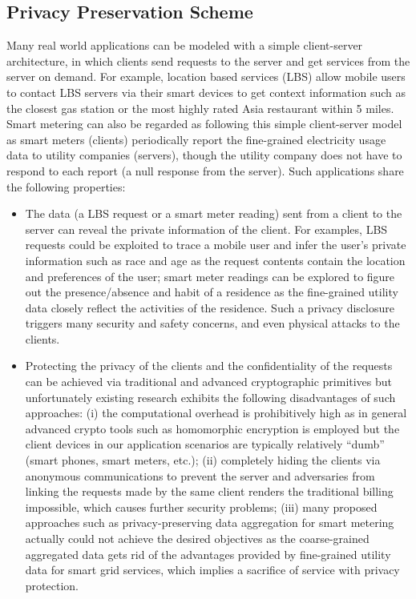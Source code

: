 \documentclass[letterpaper,12pt]{article}
\begin{document}
\subsection {Privacy Preservation Scheme}

Many real world applications can be modeled with a simple client-server architecture, in which clients send requests to the server and get services from the server on demand. For example, location based services (LBS) allow mobile users to contact LBS servers via their smart devices to get context information such as the closest gas station or the most highly rated Asia restaurant within 5 miles. Smart metering can also be regarded as following this simple client-server model as smart meters (clients) periodically report the fine-grained electricity usage data to utility companies (servers), though the utility company does not have to respond to each report (a null response from the server). Such applications share the following properties:
\begin{itemize}
\item The data (a LBS request or a smart meter reading) sent from a client to the server can reveal the private information of the client. For examples, LBS requests could be exploited to trace a mobile user and infer the user's private information such as race and age as the request contents contain the location and preferences of the user; smart meter readings can be explored to figure out the presence/absence and habit of a residence as the fine-grained utility data closely reflect the activities of the residence. Such a privacy disclosure triggers many security and safety concerns, and even physical attacks to the clients.
\item Protecting the privacy of the clients and the confidentiality of the requests can be achieved via traditional and advanced cryptographic primitives but unfortunately existing research exhibits the following disadvantages of such approaches:  (i) the computational overhead is prohibitively high as in general advanced crypto tools such as homomorphic encryption is employed but the client devices in our application scenarios are typically relatively ``dumb'' (smart phones, smart meters, etc.); (ii) completely hiding the clients via anonymous communications to prevent the server and adversaries from linking the requests made by the same client renders the traditional billing impossible, which causes further security problems; (iii) many proposed approaches such as privacy-preserving data aggregation for smart metering actually could not achieve the desired objectives as the coarse-grained aggregated data gets rid of the advantages provided by fine-grained utility data for smart grid services, which implies a sacrifice of service with privacy protection.
\end{itemize}
\end{document}
